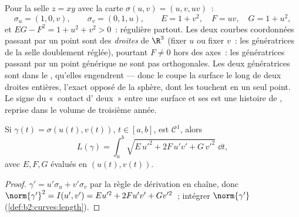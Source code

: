 \begin{example}\label{ex:b2:surfaces:saddlechart}
Pour la selle $z = xy$ avec la carte $\sigma(u, v) = (u, v,
uv)$~:
\[
\sigma_u = (1, 0, v), \qquad \sigma_v = (0, 1, u),
\qquad
E = 1 + v^2, \quad F = uv, \quad G = 1 + u^2 ,
\]
et $EG - F^2 = 1 + u^2 + v^2 > 0$~: régulière partout. Les
deux courbes coordonnées passant par un point sont des
\emph{droites} de $\R^3$ (fixer $u$ ou fixer $v$~: les
génératrices de la selle doublement réglée), pourtant $F \neq 0$
hors des axes~: les génératrices passant par un point générique
ne sont pas orthogonales. Les deux génératrices sont dans le , qu'elles engendrent --- donc le  coupe la
surface le long de deux droites entières, l'exact opposé de la
sphère, dont les  touchent en un seul point. Le
signe du «~contact d' deux~» entre une surface et ses  est une histoire de , reprise dans le volume de
troisième année.
\end{example}

\begin{proposition}\label{prop:b2:surfaces:curvelength}
Si $\gamma(t) = \sigma(u(t), v(t))$, $t \in [a, b]$, est
$\mathcal{C}^1$, alors
\[
L(\gamma) = \int_a^b
\sqrt{E\,u'^2 + 2F\,u'v' + G\,v'^2}\;\dd t ,
\]
avec $E, F, G$ évalués en $(u(t), v(t))$.
\end{proposition}

\begin{proof}
$\gamma' = u'\sigma_u + v'\sigma_v$ par la règle de dérivation en
chaîne, donc $\norm{\gamma'}^2 = I(u', v') = Eu'^2 + 2Fu'v' + Gv'^2$~;
intégrer $\norm{\gamma'}$ (\cref{def:b2:curves:length}).
\end{proof}

